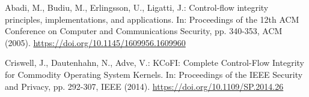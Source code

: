 \documentclass[english,sigrecommended,JIP]{ipsj}
\begin{document}
\begin{thebibliography}{99}
  Abadi, M., Budiu, M., Erlingsson, U., Ligatti, J.: Control-flow integrity principles, implementations, and applications. In: Proceedings of the 12th ACM Conference on Computer and Communications Security, pp. 340-353, ACM (2005). \url{https://doi.org/10.1145/1609956.1609960}

  Criswell, J., Dautenhahn, N., Adve, V.: KCoFI: Complete Control-Flow Integrity for Commodity Operating System Kernels. In: Proceedings of the IEEE Security and Privacy, pp. 292-307, IEEE (2014).  \url{https://doi.org/10.1109/SP.2014.26}


\end{thebibliography}
\end{document}
